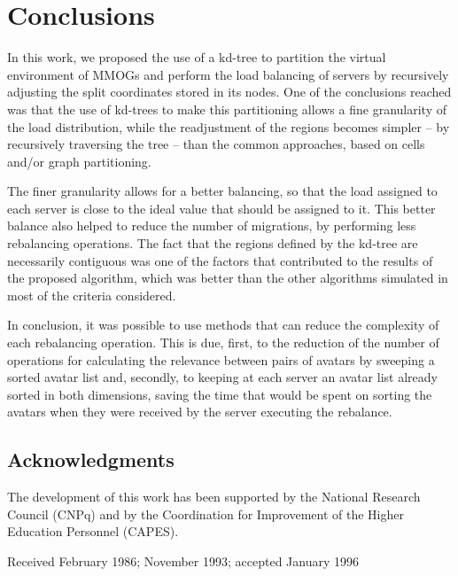 \documentclass[acmjacm]{acmtrans2m}
\let\mycounter\setcounter
\begin{document}
\section{Conclusions}
\label{sec:conc}

In this work, we proposed the use of a kd-tree to partition the virtual environment of MMOGs and perform the load balancing of servers by recursively adjusting the split coordinates stored in its nodes. One of the conclusions reached was that the use of kd-trees to make this partitioning allows a fine granularity of the load distribution, while the readjustment of the regions becomes simpler -- by recursively traversing the tree -- than the common approaches, based on cells and/or graph partitioning.

The finer granularity allows for a better balancing, so that the load assigned to each server is close to the ideal value that should be assigned to it. This better balance also helped to reduce the number of migrations, by performing less rebalancing operations. The fact that the regions defined by the kd-tree are necessarily contiguous was one of the factors that contributed to the results of the proposed algorithm, which was better than the other algorithms simulated in most of the criteria considered.

In conclusion, it was possible to use methods that can reduce the complexity of each rebalancing operation. This is due, first, to the reduction of the number of operations for calculating the relevance between pairs of avatars by sweeping a sorted avatar list and, secondly, to keeping at each server an avatar list already sorted in both dimensions, saving the time that would be spent on sorting the avatars when they were received by the server executing the rebalance.



\subsection{Acknowledgments}

The development of this work has been supported by the National Research Council (CNPq) and by the Coordination for Improvement of the Higher Education Personnel (CAPES).



\begin{received}
Received February 1986;
November 1993;
accepted January 1996
\end{received}


\medskip
\end{document}
